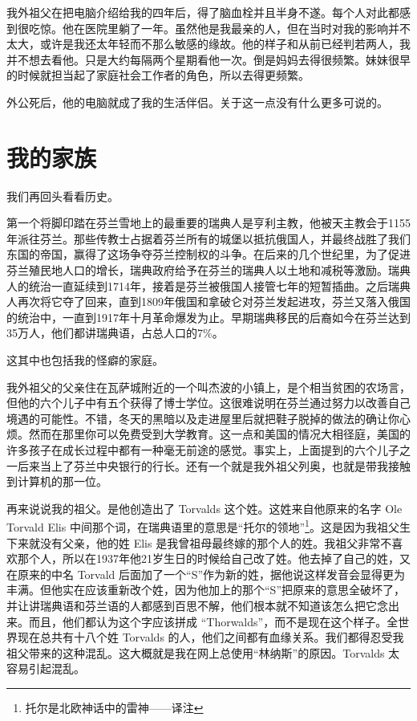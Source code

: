 \documentclass[12pt,UTF8]{ctexbook}
\begin{document}
我外祖父在把电脑介绍给我的四年后，得了脑血栓并且半身不遂。每个人对此都感到很吃惊。他在医院里躺了一年。虽然他是我最亲的人，但在当时对我的影响并不太大，或许是我还太年轻而不那么敏感的缘故。他的样子和从前已经判若两人，我并不想去看他。只是大约每隔两个星期看他一次。倒是妈妈去得很频繁。妹妹很早的时候就担当起了家庭社会工作者的角色，所以去得更频繁。

外公死后，他的电脑就成了我的生活伴侣。关于这一点没有什么更多可说的。

\section{我的家族}

我们再回头看看历史。

第一个将脚印踏在芬兰雪地上的最重要的瑞典人是亨利主教，他被天主教会于1155年派往芬兰。那些传教士占据着芬兰所有的城堡以抵抗俄国人，并最终战胜了我们东国的帝国，赢得了这场争夺芬兰控制权的斗争。在后来的几个世纪里，为了促进芬兰殖民地人口的增长，瑞典政府给予在芬兰的瑞典人以土地和减税等激励。瑞典人的统治一直延续到1714年，接着是芬兰被俄国人接管七年的短暂插曲。之后瑞典人再次将它夺了回来，直到1809年俄国和拿破仑对芬兰发起进攻，芬兰又落入俄国的统治中，一直到1917年十月革命爆发为止。早期瑞典移民的后裔如今在芬兰达到35万人，他们都讲瑞典语，占总人口的7\%。

这其中也包括我的怪癖的家庭。

我外祖父的父亲住在瓦萨城附近的一个叫杰波的小镇上，是个相当贫困的农场言，但他的六个儿子中有五个获得了博士学位。这很难说明在芬兰通过努力以改善自己境遇的可能性。不错，冬天的黑暗以及走进屋里后就把鞋子脱掉的做法的确让你心烦。然而在那里你可以免费受到大学教育。这一点和美国的情况大相径庭，美国的许多孩子在成长过程中都有一种毫无前途的感觉。事实上，上面提到的六个儿子之一后来当上了芬兰中央银行的行长。还有一个就是我外祖父列奥，也就是带我接触到计算机的那一位。

再来说说我的祖父。是他创造出了 Torvalds 这个姓。这姓来自他原来的名字 Ole Torvald
Elis 中间那个词，在瑞典语里的意思是“托尔的领地”\footnote{托尔是北欧神话中的雷神——译注}。这是因为我祖父生下来就没有父亲，他的姓 Elis 是我曾祖母最终嫁的那个人的姓。我祖父非常不喜欢那个人，所以在1937年他21岁生日的时候给自己改了姓。他去掉了自己的姓，又在原来的中名 Torvald 后面加了一个“S”作为新的姓，据他说这样发音会显得更为丰满。但他实在应该重新改个姓，因为他加上的那个“S”把原来的意思全破坏了，并让讲瑞典语和芬兰语的人都感到百思不解，他们根本就不知道该怎么把它念出来。而且，他们都认为这个字应该拼成 “Thorwalds”，而不是现在这个样子。全世界现在总共有十八个姓 Torvalds 的人，他们之间都有血缘关系。我们都得忍受我祖父带来的这种混乱。这大概就是我在网上总使用“林纳斯”的原因。Torvalds 太容易引起混乱。
\end{document}
